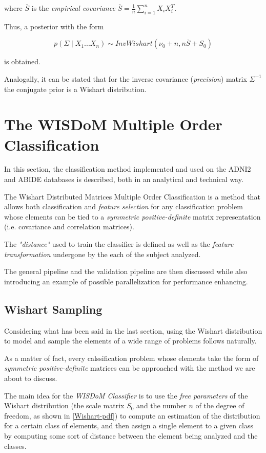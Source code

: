 \documentclass[12pt,openright,twoside,a4paper]{book}
\begin{document}
where $\overline{S}$ is the \textit{empirical covariance} $\overline{S}=\frac{1}{n}\sum_{i=1}
^nX_iX_i^T$.

Thus, a posterior with the form

\begin{equation}
p(\Sigma\mid X_1...X_n)\sim InvWishart(\nu_0+n, n\overline{S}+S_0)
\end{equation}

is obtained.

Analogally, it can be stated that for the inverse covariance (\textit{precision}) matrix $\Sigma^{-1}$ the conjugate prior is a Wishart distribution.

\chapter{The WISDoM Multiple Order Classification}

In this section, the classification method implemented and used on the ADNI2 and ABIDE databases is described, both in an analytical and technical way.
\vspace{5mm}

The Wishart Distributed Matrices Multiple Order Classification is a method that allows both classification and \textit{feature selection} for any classification problem whose elements can be tied to a \textit{symmetric positive-definite} matrix representation (i.e. covariance and correlation matrices).

 The \textit{"distance"} used to train the classifier is defined as well as the \textit{feature transformation} undergone by the each of the subject analyzed.

The general pipeline and the validation pipeline are then discussed while also introducing an example of possible parallelization for performance enhancing.

\section{Wishart Sampling}

Considering what has been said in the last section, using the Wishart distribution to model and sample the elements of a wide range of problems follows naturally.

As a matter of fact, every calssification problem whose elements take the form of \textit{symmetric positive-definite} matrices can be approached with the method we are about to discuss.

The main idea for the \textit{WISDoM Classifier} is to use the \textit{free parameters} of the Wishart distribution (the scale matrix $S_0$ and the number $n$ of the degree of freedom, as shown in \ref{Wishart-pdf}) to compute an estimation of the distribution for a certain class of elements, and then assign a single element to a given class by computing some sort of distance between the element being analyzed and the classes.
\end{document}
